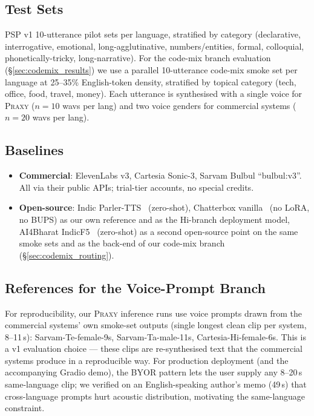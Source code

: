 \documentclass[conference,a4paper]{IEEEtran}
\newcommand{\psp}{\textsc{PSP}}
\newcommand{\praxy}{\textsc{Praxy}}
\begin{document}
\subsection{Test Sets}
\label{sec:test_sets}
\psp{} v1 10-utterance pilot sets per language, stratified by category (declarative, interrogative, emotional, long-agglutinative, numbers/entities, formal, colloquial, phonetically-tricky, long-narrative). For the code-mix branch evaluation (§\ref{sec:codemix_results}) we use a parallel 10-utterance code-mix smoke set per language at 25--35\% English-token density, stratified by topical category (tech, office, food, travel, money). Each utterance is synthesised with a single voice for \praxy{} ($n=10$ wavs per lang) and two voice genders for commercial systems ($n=20$ wavs per lang).

\subsection{Baselines}
\label{sec:baselines}
\begin{itemize}
  \item \textbf{Commercial}: ElevenLabs v3, Cartesia Sonic-3, Sarvam Bulbul ``bulbul:v3''. All via their public APIs; trial-tier accounts, no special credits.
  \item \textbf{Open-source}: Indic Parler-TTS~\cite{parler2024} (zero-shot), Chatterbox vanilla~\cite{chatterbox2025} (no LoRA, no BUPS) as our own reference and as the Hi-branch deployment model, AI4Bharat IndicF5~\cite{indicf52024} (zero-shot) as a second open-source point on the same smoke sets and as the back-end of our code-mix branch (§\ref{sec:codemix_routing}).
\end{itemize}

\subsection{References for the Voice-Prompt Branch}
For reproducibility, our \praxy{} inference runs use voice prompts drawn from the commercial systems' own smoke-set outputs (single longest clean clip per system, 8--11\,s): Sarvam-Te-female-9s, Sarvam-Ta-male-11s, Cartesia-Hi-female-6s. This is a v1 evaluation choice --- these clips are re-synthesised text that the commercial systems produce in a reproducible way. For production deployment (and the accompanying Gradio demo), the BYOR pattern lets the user supply any 8--20\,s same-language clip; we verified on an English-speaking author's memo (49\,s) that cross-language prompts hurt acoustic distribution, motivating the same-language constraint.
\end{document}
